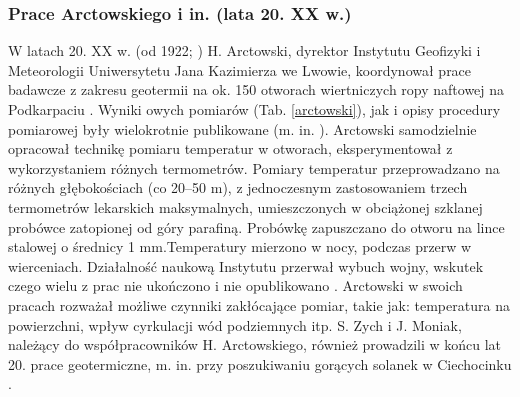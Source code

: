 \documentclass[11.5pt,twoside]{report}
\begin{document}
\subsubsection{Prace Arctowskiego i in. (lata 20. XX w.)}

W latach 20. XX w. (od 1922; \cite{Olpinska.1988}) H. Arctowski, dyrektor Instytutu Geofizyki i Meteorologii Uniwersytetu Jana Kazimierza we Lwowie, koordynował prace badawcze z zakresu geotermii na ok. 150 otworach wiertniczych ropy naftowej na Podkarpaciu \parencite{Maj.2010,Olpinska.1988}. Wyniki owych pomiarów (Tab. \ref{arctowski}), jak i opisy procedury pomiarowej były wielokrotnie publikowane (m. in. \cite{Arctowski.1923c,Arctowski.1923b,Arctowski.1923a}). Arctowski samodzielnie opracował technikę pomiaru temperatur w otworach, eksperymentował z wykorzystaniem różnych termometrów. Pomiary temperatur przeprowadzano na różnych głębokościach (co 20--50 m), z jednoczesnym zastosowaniem trzech termometrów lekarskich maksymalnych, umieszczonych w obciążonej szklanej probówce zatopionej od góry parafiną. Probówkę zapuszczano do otworu na lince stalowej o średnicy 1 mm.Temperatury mierzono w nocy, podczas przerw w wierceniach. Działalność naukową Instytutu przerwał wybuch wojny, wskutek czego wielu z prac nie ukończono i nie opublikowano \parencite{Olpinska.1988}. Arctowski w swoich pracach rozważał możliwe czynniki zakłócające pomiar, takie jak: temperatura na powierzchni, wpływ cyrkulacji wód podziemnych itp. S. Zych i J. Moniak, należący do współpracowników H. Arctowskiego, również prowadzili w końcu lat 20. prace geotermiczne, m. in. przy poszukiwaniu gorących solanek w Ciechocinku \parencite{Maj.2010}.

\end{document}
